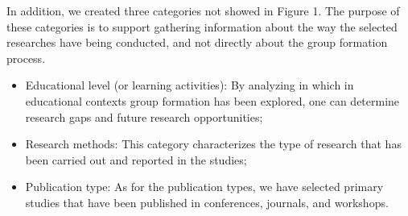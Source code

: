 In addition, we created three categories not showed in Figure 1. The purpose of these categories is to support gathering information about the way the selected researches have being conducted, and not directly about the group formation process.

\begin{itemize}
\item Educational level (or learning activities): By analyzing in which in educational contexts group formation has been explored, one can determine research gaps and future research opportunities;
\item Research methods: This category characterizes the type of research that has been carried out and reported in the studies;
\item Publication type: As for the publication types, we have selected primary studies that have been published in conferences, journals, and workshops.
\end{itemize}